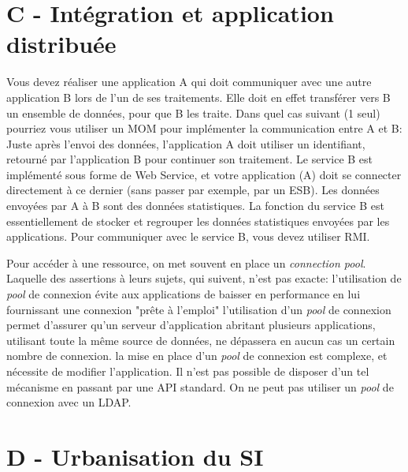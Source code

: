 \documentclass[a4paper,10pt]{article}
\begin{document}
\section{C - Intégration et application distribuée}

\begin{question}{Vous devez réaliser une application A qui doit communiquer avec une autre
application B lors de l'un de ses traitements. Elle doit en effet transférer vers B un ensemble de
données, pour que B les traite. Dans quel cas suivant (1 seul) pourriez vous utiliser un MOM pour
implémenter la communication entre A et B:}
  \false Juste après l'envoi des données, l'application A doit utiliser un identifiant, retourné par
  l'application B pour continuer son traitement.
  \false Le service B est implémenté sous forme de Web Service, et votre application (A) doit se
  connecter directement à ce dernier (sans passer par exemple, par un ESB).
  \true Les données envoyées par A à B sont des données statistiques. La fonction du service B est
  essentiellement de stocker et regrouper les données statistiques envoyées par les applications.
  \false Pour communiquer avec le service B, vous devez utiliser RMI.
\end{question}

\begin{question}{Pour accéder à une ressource, on met souvent en place un \textit{connection pool}.
Laquelle des assertions à leurs sujets, qui suivent, n'est pas exacte:}
  \false l'utilisation de \textit{pool} de connexion évite aux applications de baisser en
  performance en lui fournissant une connexion "prête à l'emploi"
  \false l'utilisation d'un \textit{pool} de connexion permet d'assurer qu'un serveur d'application
  abritant plusieurs applications, utilisant toute la même source de données, ne dépassera en aucun
  cas un certain nombre de connexion.
  \true la mise en place d'un \textit{pool} de connexion est complexe, et nécessite de modifier
  l'application. Il n'est pas possible de disposer d'un tel mécanisme en passant par une API
  standard.
  \false On ne peut pas utiliser un \textit{pool} de connexion avec un LDAP.
\end{question}

\section{D - Urbanisation du SI}
\end{document}
